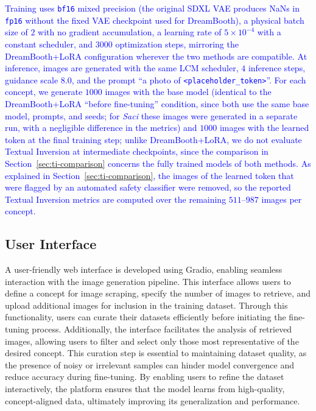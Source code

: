\documentclass[pdflatex,sn-mathphys-num]{sn-jnl}%
\theoremstyle{thmstyleone}%
\theoremstyle{thmstyletwo}%
\theoremstyle{thmstylethree}%
\begin{document}
\textcolor{blue}{Training uses \texttt{bf16} mixed precision (the original SDXL VAE produces NaNs in \texttt{fp16} without the fixed VAE checkpoint used for DreamBooth), a physical batch size of $2$ with no gradient accumulation, a learning rate of $5\times 10^{-4}$ with a constant scheduler, and $3000$ optimization steps, mirroring the DreamBooth+LoRA configuration wherever the two methods are compatible. At inference, images are generated with the same LCM scheduler, $4$ inference steps, guidance scale $8.0$, and the prompt ``a photo of \texttt{<placeholder\_token>}''. For each concept, we generate $1000$ images with the base model (identical to the DreamBooth+LoRA ``before fine-tuning'' condition, since both use the same base model, prompts, and seeds; for \textit{Saci} these images were generated in a separate run, with a negligible difference in the metrics) and $1000$ images with the learned token at the final training step; unlike DreamBooth+LoRA, we do not evaluate Textual Inversion at intermediate checkpoints, since the comparison in Section~\ref{sec:ti-comparison} concerns the fully trained models of both methods. As explained in Section~\ref{sec:ti-comparison}, the images of the learned token that were flagged by an automated safety classifier were removed, so the reported Textual Inversion metrics are computed over the remaining $511$--$987$ images per concept.}

\subsection{User Interface}
A user-friendly web interface is developed using Gradio, enabling seamless interaction with the image generation pipeline. This interface allows users to define a concept for image scraping, specify the number of images to retrieve, and upload additional images for inclusion in the training dataset. Through this functionality, users can curate their datasets efficiently before initiating the fine-tuning process. Additionally, the interface facilitates the analysis of retrieved images, allowing users to filter and select only those most representative of the desired concept. This curation step is essential to maintaining dataset quality, as the presence of noisy or irrelevant samples can hinder model convergence and reduce accuracy during fine-tuning. By enabling users to refine the dataset interactively, the platform ensures that the model learns from high-quality, concept-aligned data, ultimately improving its generalization and performance.
\end{document}
